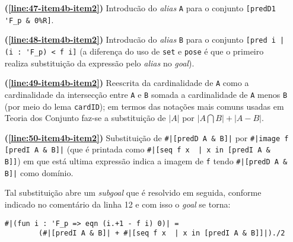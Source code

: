 \begin{enumerate}[label=\textbf{\roman*.}]
\begin{enumerate}[label=\textbf{\roman{enumi}.(\alph*)}]
\begin{enumerate}[label=\textbf{(\alph{enumii}.\arabic*)}]
\begin{enumerate}[listparindent=\parindent]
                                \item[\textbf{(\ref{line:47-item4b-item2})}] Introducão do \textit{alias} \lstinline[language=coq]|A| para o conjunto \lstinline[language=coq]|[predD1 'F_p & 0%R]|.
                                
                                \item[\textbf{(\ref{line:48-item4b-item2})}] Introducão do \textit{alias} \lstinline[language=coq]|B| para o conjunto \lstinline[language=coq]![pred i |  (i : 'F_p) < f i]! (a diferença do uso de \lstinline[language=coq]|set| e \lstinline[language=coq]|pose| é que o primeiro realiza substituição da expressão pelo \textit{alias} no \textit{goal}).
                                
                                \item[\textbf{(\ref{line:49-item4b-item2})}] Reescrita da cardinalidade de \lstinline[language=coq]!A! como a cardinalidade da intersecção entre \lstinline[language=coq]!A! e \lstinline[language=coq]!B! somada a cardinalidade de \lstinline[language=coq]!A! menos \lstinline[language=coq]!B! (por meio do lema \lstinline[language=coq]!cardID!); em termos das notações mais comuns usadas em Teoria dos Conjunto faz-se a substituição de $|A|$ por $|A \bigcap B| + |A - B|$.
                                
                                \item[\textbf{(\ref{line:50-item4b-item2})}] Substituição de \lstinline[language=coq]!#|[predD A & B]|! por \lstinline[language=coq]!#|image f [predI A & B]|! (que é printada como \lstinline[language=coq]!#|[seq f x  | x in [predI A & B]]!) em que está ultima expressão indica a imagem de \lstinline[language=coq]!f! tendo \lstinline[language=coq]!#|[predD A & B]|! como domínio. 
                                
                                Tal substituição abre um \textit{subgoal} que é resolvido em seguida, conforme indicado no comentário da linha 12 e com isso o \textit{goal} se torna:
                                        \begin{lstlisting}[language=coq,frame=single,tabsize=1]
#|(fun i : 'F_p => eqn (i.+1 - f i) 0)| = 
        (#|[predI A & B]| + #|[seq f x  | x in [predI A & B]]|)./2
                                        \end{lstlisting}


\end{enumerate}
\end{enumerate}
\end{enumerate}
\end{enumerate}
